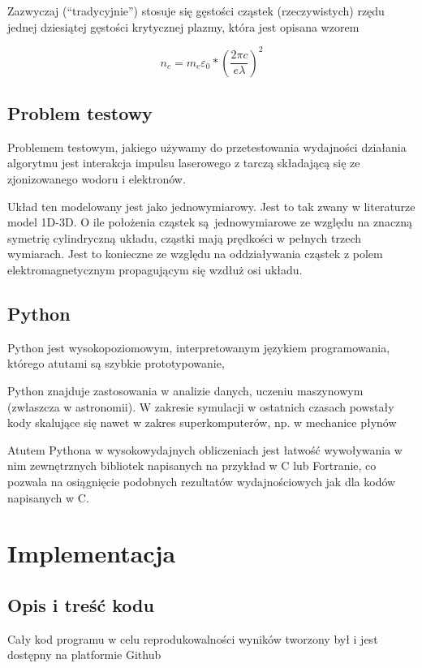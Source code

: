     Zazwyczaj (``tradycyjnie'') stosuje się gęstości cząstek (rzeczywistych) rzędu jednej dziesiątej gęstości krytycznej plazmy,
    która jest opisana wzorem

    \begin{equation}
        n_c = m_e \varepsilon_0 * (\frac{2 \pi c}{e \lambda})^2
        \label{eqn:critical-density}
    \end{equation}

    \subsection{Problem testowy}

    Problemem testowym, jakiego używamy do przetestowania wydajności działania algorytmu jest
    interakcja impulsu laserowego z tarczą składającą się ze zjonizowanego wodoru i elektronów.

    Układ ten modelowany jest jako jednowymiarowy. Jest to tak zwany w literaturze model 1D-3D. O ile położenia cząstek
    są jednowymiarowe ze względu na znaczną symetrię
    cylindryczną układu, cząstki mają prędkości w pełnych trzech wymiarach. Jest to konieczne ze względu
    na oddziaływania cząstek z polem elektromagnetycznym propagującym się wzdłuż osi układu.

    \subsection{Python}
    Python jest wysokopoziomowym, interpretowanym językiem programowania, którego atutami są szybkie prototypowanie,

    Python znajduje zastosowania w analizie danych, uczeniu maszynowym (zwłaszcza w astronomii). W zakresie symulacji
    w ostatnich czasach powstały kody skalujące się nawet w zakres superkomputerów, np. w mechanice płynów %

    Atutem Pythona w wysokowydajnych obliczeniach jest łatwość wywoływania w nim zewnętrznych bibliotek napisanych
    na przykład w C lub Fortranie, co pozwala na osiągnięcie podobnych rezultatów wydajnościowych jak dla kodów
    napisanych w C.


    \section[Implementacja]{Implementacja}%
    \subsection{Opis i treść kodu}
    Cały kod programu w celu reprodukowalności wyników tworzony był i jest dostępny na platformie Github %

